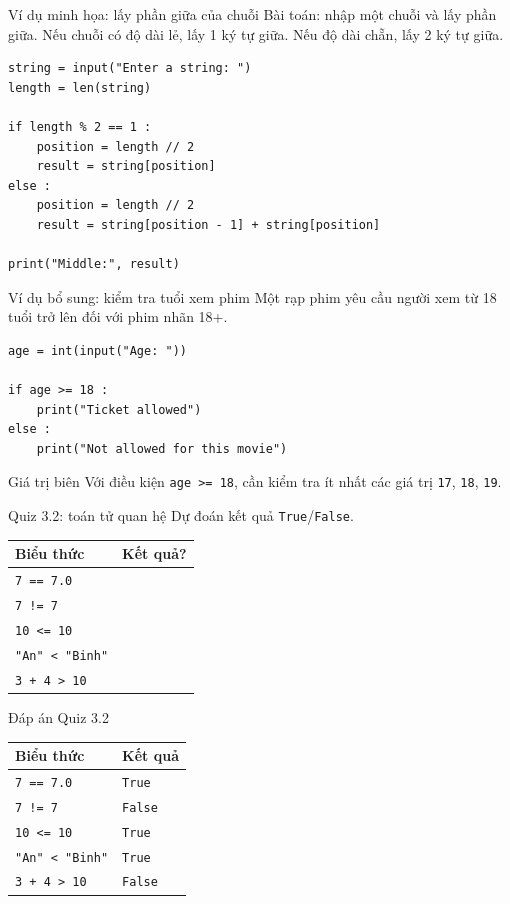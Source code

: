 \documentclass[aspectratio=169,11pt]{beamer}
\newcommand{\code}[1]{\texttt{#1}}
\newcommand{\smallgap}{\vspace{0.4em}}
\begin{document}
\begin{frame}[fragile]{Ví dụ minh họa: lấy phần giữa của chuỗi}
Bài toán: nhập một chuỗi và lấy phần giữa.
\smallgap
Nếu chuỗi có độ dài lẻ, lấy 1 ký tự giữa. Nếu độ dài chẵn, lấy 2 ký tự giữa.
\begin{lstlisting}[style=py]
string = input("Enter a string: ")
length = len(string)

if length % 2 == 1 :
    position = length // 2
    result = string[position]
else :
    position = length // 2
    result = string[position - 1] + string[position]

print("Middle:", result)
\end{lstlisting}
\end{frame}



\begin{frame}[fragile]{Ví dụ bổ sung: kiểm tra tuổi xem phim}
Một rạp phim yêu cầu người xem từ 18 tuổi trở lên đối với phim nhãn 18+.
\begin{lstlisting}[style=py]
age = int(input("Age: "))

if age >= 18 :
    print("Ticket allowed")
else :
    print("Not allowed for this movie")
\end{lstlisting}
\begin{block}{Giá trị biên}
Với điều kiện \code{age >= 18}, cần kiểm tra ít nhất các giá trị \code{17}, \code{18}, \code{19}.
\end{block}
\end{frame}

\begin{frame}{Quiz 3.2: toán tử quan hệ}
Dự đoán kết quả \code{True}/\code{False}.
\begin{center}
\begin{tabular}{ll}
\toprule
Biểu thức & Kết quả? \\
\midrule
\code{7 == 7.0} & \\
\code{7 != 7} & \\
\code{10 <= 10} & \\
\code{"An" < "Binh"} & \\
\code{3 + 4 > 10} & \\
\bottomrule
\end{tabular}
\end{center}
\end{frame}

\begin{frame}{Đáp án Quiz 3.2}
\begin{center}
\begin{tabular}{ll}
\toprule
Biểu thức & Kết quả \\
\midrule
\code{7 == 7.0} & \code{True} \\
\code{7 != 7} & \code{False} \\
\code{10 <= 10} & \code{True} \\
\code{"An" < "Binh"} & \code{True} \\
\code{3 + 4 > 10} & \code{False} \\
\bottomrule
\end{tabular}
\end{center}
\end{frame}
\end{document}
